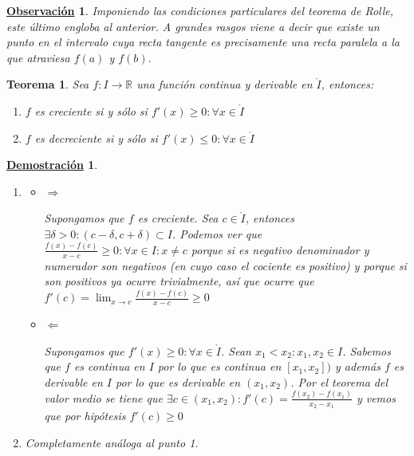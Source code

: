 \documentclass[10pt,a4paper,openright]{book}
\theoremstyle{break}
\newtheorem{theo}{Teorema}[chapter]
\newtheorem*{demo}{\underline{Demostración}}
\newtheorem{obs}{\underline{Observación}}[chapter]
\begin{document}
\begin{obs}
Imponiendo las condiciones particulares del teorema de Rolle, este último engloba al anterior. A grandes rasgos viene a decir que existe un punto en el intervalo cuya recta tangente es precisamente una recta paralela a la que atraviesa $f(a)$ y $f(b)$.
\end{obs}

\begin{theo}
Sea $f:I\rightarrow\mathbb R$ una función continua y derivable en $\mathring{I}$, entonces:
\begin{enumerate}
\item $f$ es creciente si y sólo si $f'(x)\geq 0: \forall x\in \mathring{I}$
\item $f$ es decreciente si y sólo si $f'(x)\leq 0: \forall x\in \mathring{I}$
\end{enumerate}
\end{theo}
\begin{demo}
\begin{enumerate}
\item
	\begin{itemize}
	\item $\Rightarrow$
	
	Supongamos que $f$ es creciente. Sea $c\in \mathring{I}$, entonces $\exists \delta>0: (c-\delta, c+\delta)\subset I$. Podemos ver que $\frac{f(x)-f(c)}{x-c}\geq 0: \forall x\in I: x\neq c$ porque si es negativo denominador y numerador son negativos (en cuyo caso el cociente es positivo) y porque si son positivos ya ocurre trivialmente, así que ocurre que $f'(c)=\lim_{x\rightarrow c} \frac{f(x)-f(c)}{x-c} \geq 0$
	
	\item $\Leftarrow$
	
	Supongamos que $f'(x)\geq 0: \forall x \in \mathring{I}$. Sean $x_1<x_2: x_1,x_2\in I$. Sabemos que $f$ es continua en $I$ por lo que es continua en $[x_1,x_2])$ y además $f$ es derivable en $I$ por lo que es derivable en $(x_1,x_2)$. Por el teorema del valor medio se tiene que $\exists c\in (x_1,x_2): f'(c)=\frac{f(x_2)-f(x_1)}{x_2-x_1}$ y vemos que por hipótesis $f'(c)\geq 0$	
	\end{itemize}
	
\item Completamente análoga al punto 1.
\end{enumerate}
\end{demo}
\end{document}

